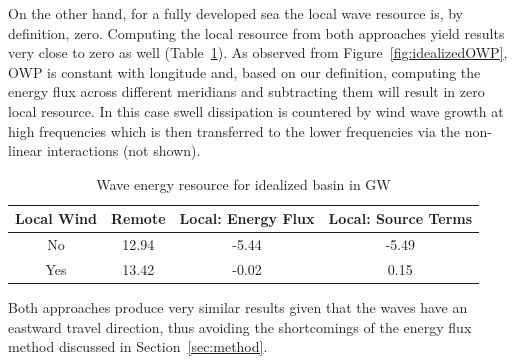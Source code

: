 On the other hand, for a fully developed sea the local wave resource is, by definition, zero. Computing the local resource from both approaches yield results very close to zero as well (Table~\ref{table:idealizedResource}). As observed from Figure~\ref{fig:idealizedOWP}, OWP is constant with longitude and, based on our definition, computing the energy flux across different meridians and subtracting them will result in zero local resource. In this case swell dissipation is countered by wind wave growth at high frequencies which is then transferred to the lower frequencies via the non-linear interactions (not shown).

\begin{table}[ht]
  \centering
  \begin{tabular}{c|ccc}
    \hline
    Local Wind & Remote & Local: Energy Flux & Local: Source Terms \\
    \hline
    No  & 12.94 & -5.44 & -5.49 \\
    Yes & 13.42 & -0.02 &  0.15 \\
\hline
  \end{tabular}
  \caption{Wave energy resource for idealized basin in GW}
  \label{table:idealizedResource}
\end{table}

Both approaches produce very similar results given that the waves have an eastward travel direction, thus avoiding the shortcomings of the energy flux method discussed in Section~\ref{sec:method}.

